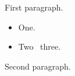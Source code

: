 \documentclass{article}
\begin{document}
First paragraph.

\begin{itemize}
\item One.
\item Two \lxmbf\ three.
\end{itemize}
Second paragraph.
\end{document}
